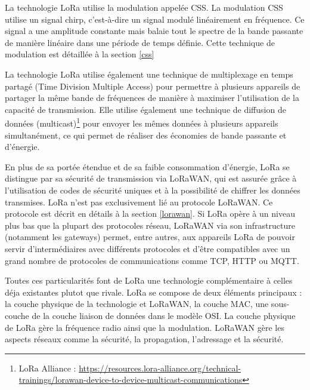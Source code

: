 \vspace{0.1cm}

La technologie LoRa utilise la modulation appelée \ac{CSS}. La modulation \ac{CSS} utilise un signal chirp, c'est-à-dire un signal modulé linéairement en fréquence. Ce signal a une amplitude constante mais balaie tout le spectre de la bande passante de manière linéaire dans une période de temps définie. Cette technique de modulation est détaillée à la section \ref{css}

\vspace{0.1cm}

La technologie \ac{LoRa} utilise également une technique de multiplexage en temps partagé (Time Division Multiple Access) pour permettre à plusieurs appareils de partager la même bande de fréquences de manière à maximiser l'utilisation de la capacité de transmission. Elle utilise également une technique de diffusion de données (multicast)\footnote{LoRa Alliance : \href{https://resources.lora-alliance.org/technical-trainings/lorawan-device-to-device-multicast-communications}{https://resources.lora-alliance.org/technical-trainings/lorawan-device-to-device-multicast-communications}} pour envoyer les mêmes données à plusieurs appareils simultanément, ce qui permet de réaliser des économies de bande passante et d'énergie.

\vspace{0.1cm}

En plus de sa portée étendue et de sa faible consommation d'énergie, LoRa se distingue par sa sécurité de transmission via LoRaWAN, qui est assurée grâce à l'utilisation de codes de sécurité uniques et à la possibilité de chiffrer les données transmises. \ac{LoRa} n'est pas exclusivement lié au protocole LoRaWAN. Ce protocole est décrit en détails à la section \ref{lorawan}. Si \ac{LoRa} opère à un niveau plus bas que la plupart des protocoles réseau, LoRaWAN via son infrastructure (notamment les gateways) permet, entre autres, aux appareils LoRa de pouvoir servir d'intermédiaires avec différents protocoles et d'être compatibles avec un grand nombre de protocoles de communications comme \ac{TCP}, \ac{HTTP} ou \ac{MQTT}.

\vspace{0.1cm}

Toutes ces  particularités font de \ac{LoRa} une technologie complémentaire à celles déja existantes plutot que rivale.
\ac{LoRa} se compose de deux éléments principaux : la couche physique de la technologie et LoRaWAN, la couche \ac{MAC}, une sous-couche de la couche liaison de données dans le modèle \ac{OSI}. La couche physique de \ac{LoRa} gère la fréquence radio ainsi que la modulation. LoRaWAN gère les aspects réseaux comme la sécurité, la propagation, l'adressage et la sécurité.

